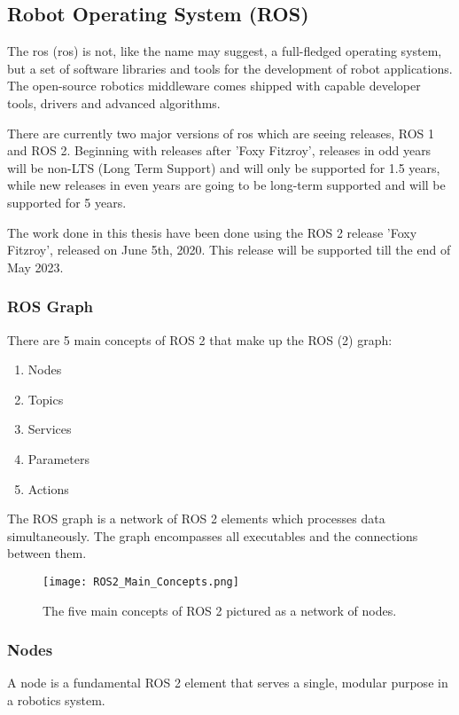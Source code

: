 \subsection{Robot Operating System (ROS)} \label{sec:Robot Operating System (ROS)}
The \acrlong{ros} (\acrshort{ros}) is not, like the name may suggest, a full-fledged operating system, but a set of software libraries and tools for the development of robot applications. The open-source robotics middleware comes shipped with capable developer tools, drivers and advanced algorithms. \cite{ros2_documentation}

There are currently two major versions of \acrshort{ros} which are seeing releases, ROS 1 and ROS 2. \cite{ros2_documentation} Beginning with releases after 'Foxy Fitzroy', releases in odd years will be non-LTS (Long Term Support) and will only be supported for 1.5 years, while new releases in even years are going to be long-term supported and will be supported for 5 years. \cite{ros2_documentation}

The work done in this thesis have been done using the ROS 2 release 'Foxy Fitzroy', released on June 5th, 2020. This release will be supported till the end of May 2023. \cite{ros2_releases_and_target_platforms}

\subsubsection{ROS Graph} \label{sec:ROS Graph}
There are 5 main concepts of ROS 2 that make up the ROS (2) graph:
\begin{enumerate}
    \item Nodes
    \item Topics
    \item Services
    \item Parameters
    \item Actions
\end{enumerate}

The ROS graph is a network of ROS 2 elements which processes data simultaneously. The graph encompasses all executables and the connections between them.

\begin{figure}[H]
    \centering
    \texttt{[image: ROS2\_Main\_Concepts.png]}
    \caption{The five main concepts of ROS 2 pictured as a network of nodes.}
    \label{fig:ROS 2 main concepts}
\end{figure}

\subsubsection{Nodes} \label{sec:ROS Nodes}
A node is a fundamental ROS 2 element that serves a single, modular purpose in a robotics system. \cite{ros2_documentation}

